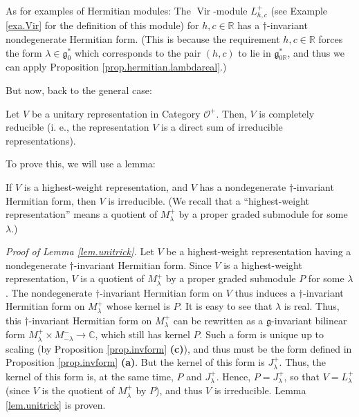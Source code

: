 \documentclass[etingof-lie.tex]{subfiles}
\begin{document}
As for examples of Hermitian modules: The $\operatorname*{Vir}$-module
$L_{h,c}^{+}$ (see Example \ref{exa.Vir} for the definition of this module)
for $h,c\in\mathbb{R}$ has a $\dag$-invariant nondegenerate Hermitian form.
(This is because the requirement $h,c\in\mathbb{R}$ forces the form
$\lambda\in\mathfrak{g}_{0}^{\ast}$ which corresponds to the pair $\left(
h,c\right)  $ to lie in $\mathfrak{g}_{0\mathbb{R}}^{\ast}$, and thus we can
apply Proposition \ref{prop.hermitian.lambdareal}.)

But now, back to the general case:

\begin{proposition}
\label{prop.unitrick}Let $V$ be a unitary representation in Category
$\mathcal{O}^{+}$. Then, $V$ is completely reducible (i. e., the
representation $V$ is a direct sum of irreducible representations).
\end{proposition}

To prove this, we will use a lemma:

\begin{lemma}
\label{lem.unitrick}If $V$ is a highest-weight representation, and $V$ has a
nondegenerate $\dag$-invariant Hermitian form, then $V$ is irreducible. (We
recall that a ``highest-weight representation'' means a quotient of
$M_{\lambda}^{+}$ by a proper graded submodule for some $\lambda$.)
\end{lemma}

\textit{Proof of Lemma \ref{lem.unitrick}.} Let $V$ be a highest-weight
representation having a nondegenerate $\dag$-invariant Hermitian form. Since
$V$ is a highest-weight representation, $V$ is a quotient of $M_{\lambda}^{+}$
by a proper graded submodule $P$ for some $\lambda$. The nondegenerate $\dag
$-invariant Hermitian form on $V$ thus induces a $\dag$-invariant Hermitian
form on $M_{\lambda}^{+}$ whose kernel is $P$. It is easy to see that
$\lambda$ is real. Thus, this $\dag$-invariant Hermitian form on $M_{\lambda
}^{+}$ can be rewritten as a $\mathfrak{g}$-invariant bilinear form
$M_{\lambda}^{+}\times M_{-\lambda}^{-}\rightarrow\mathbb{C}$, which still has
kernel $P$. Such a form is unique up to scaling (by Proposition
\ref{prop.invform} \textbf{(c)}), and thus must be the form defined in
Proposition \ref{prop.invform} \textbf{(a)}. But the kernel of this form is
$J_{\lambda}^{+}$. Thus, the kernel of this form is, at the same time, $P$ and
$J_{\lambda}^{+}$. Hence, $P=J_{\lambda}^{+}$, so that $V=L_{\lambda}^{+}$
(since $V$ is the quotient of $M_{\lambda}^{+}$ by $P$), and thus $V$ is
irreducible. Lemma \ref{lem.unitrick} is proven.
\end{document}
